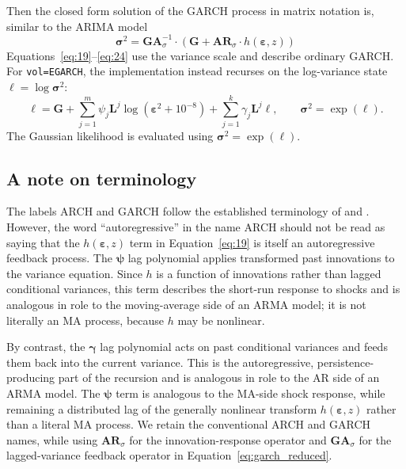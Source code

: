 \documentclass[12pt]{article}
\begin{document}
Then the closed form solution of the GARCH process in matrix notation is, similar to the ARIMA model
\begin{equation}
 \mathbf{\sigma}^{2}  = \mathbf{GA}_{\sigma}^{- 1}\cdot \left(\mathbf{G} +\mathbf{AR}_{\sigma} \cdot h( \mathbf{\varepsilon},z ) \right)
\label{eq:24}
\end{equation}
Equations~\ref{eq:19}--\ref{eq:24} use the variance scale and describe ordinary GARCH. For \texttt{vol=EGARCH}, the implementation instead recurses on the log-variance state $\boldsymbol{\ell}=\log\boldsymbol{\sigma}^{2}$:
\begin{equation}
\boldsymbol{\ell}
=\mathbf{G}+\sum_{j=1}^{m}\psi_j\mathbf{L}^j\log(\boldsymbol{\varepsilon}^{2}+10^{-8})
+\sum_{j=1}^{k}\gamma_j\mathbf{L}^j\boldsymbol{\ell},
\qquad \boldsymbol{\sigma}^{2}=\exp(\boldsymbol{\ell}).
\label{eq:egarch-log-state}
\end{equation}
The Gaussian likelihood is evaluated using $\boldsymbol{\sigma}^{2}=\exp(\boldsymbol{\ell})$.

\subsection{A note on terminology}
The labels ARCH and GARCH follow the established terminology of \citet{engle1982autoregressive} and \citet{bollerslev1986generalized}. However, the word ``autoregressive'' in the name ARCH should not be read as saying that the $h(\boldsymbol{\varepsilon},z)$ term in Equation~\ref{eq:19} is itself an autoregressive feedback process. The $\boldsymbol{\psi}$ lag polynomial applies transformed past innovations to the variance equation. Since $h$ is a function of innovations rather than lagged conditional variances, this term describes the short-run response to shocks and is analogous in role to the moving-average side of an ARMA model; it is not literally an MA process, because $h$ may be nonlinear.

By contrast, the $\boldsymbol{\gamma}$ lag polynomial acts on past conditional variances and feeds them back into the current variance. This is the autoregressive, persistence-producing part of the recursion and is analogous in role to the AR side of an ARMA model. The $\boldsymbol{\psi}$ term is analogous to the MA-side shock response, while remaining a distributed lag of the generally nonlinear transform $h(\boldsymbol{\varepsilon},z)$ rather than a literal MA process. We retain the conventional ARCH and GARCH names, while using $\mathbf{AR}_\sigma$ for the innovation-response operator and $\mathbf{GA}_\sigma$ for the lagged-variance feedback operator in Equation~\ref{eq:garch_reduced}.
\end{document}
